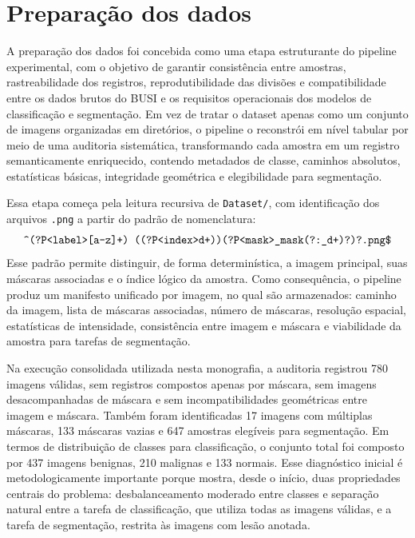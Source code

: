 \documentclass[tcc,capa]{texufpel}
\begin{document}
\section{Preparação dos dados}

A preparação dos dados foi concebida como uma etapa estruturante do pipeline experimental, com o objetivo de garantir consistência entre amostras, rastreabilidade dos registros, reprodutibilidade das divisões e compatibilidade entre os dados brutos do BUSI e os requisitos operacionais dos modelos de classificação e segmentação. Em vez de tratar o dataset apenas como um conjunto de imagens organizadas em diretórios, o pipeline o reconstrói em nível tabular por meio de uma auditoria sistemática, transformando cada amostra em um registro semanticamente enriquecido, contendo metadados de classe, caminhos absolutos, estatísticas básicas, integridade geométrica e elegibilidade para segmentação.

Essa etapa começa pela leitura recursiva de \texttt{Dataset/}, com identificação dos arquivos \texttt{.png} a partir do padrão de nomenclatura:
\begin{equation}
	\texttt{\string^(?P<label>[a-z]+) \string((?P<index>\string d+)\string)(?P<mask>\string_mask(?:\string_\string d+)?)?\string.\string png\$}
\end{equation}
Esse padrão permite distinguir, de forma determinística, a imagem principal, suas máscaras associadas e o índice lógico da amostra. Como consequência, o pipeline produz um manifesto unificado por imagem, no qual são armazenados: caminho da imagem, lista de máscaras associadas, número de máscaras, resolução espacial, estatísticas de intensidade, consistência entre imagem e máscara e viabilidade da amostra para tarefas de segmentação.

Na execução consolidada utilizada nesta monografia, a auditoria registrou 780 imagens válidas, sem registros compostos apenas por máscara, sem imagens desacompanhadas de máscara e sem incompatibilidades geométricas entre imagem e máscara. Também foram identificadas 17 imagens com múltiplas máscaras, 133 máscaras vazias e 647 amostras elegíveis para segmentação. Em termos de distribuição de classes para classificação, o conjunto total foi composto por 437 imagens benignas, 210 malignas e 133 normais. Esse diagnóstico inicial é metodologicamente importante porque mostra, desde o início, duas propriedades centrais do problema: desbalanceamento moderado entre classes e separação natural entre a tarefa de classificação, que utiliza todas as imagens válidas, e a tarefa de segmentação, restrita às imagens com lesão anotada.
\end{document}
